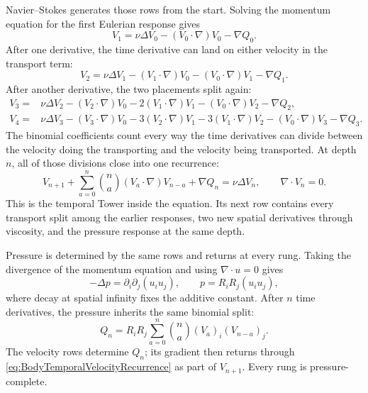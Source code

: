 Navier--Stokes generates those rows from the start.  Solving the momentum equation for the first Eulerian response gives
\[
  V_1
  =\nu\Delta V_0-(V_0\cdot\nabla)V_0-\nabla Q_0.
\]
After one derivative, the time derivative can land on either velocity in the transport term:
\[
  V_2
  =\nu\Delta V_1
  -(V_1\cdot\nabla)V_0
  -(V_0\cdot\nabla)V_1
  -\nabla Q_1.
\]
After another derivative, the two placements split again:
\[
\begin{aligned}
  V_3={}&
  \nu\Delta V_2
  -(V_2\cdot\nabla)V_0
  -2(V_1\cdot\nabla)V_1
  -(V_0\cdot\nabla)V_2
  -\nabla Q_2,
  \\
  V_4={}&
  \nu\Delta V_3
  -(V_3\cdot\nabla)V_0
  -3(V_2\cdot\nabla)V_1
  -3(V_1\cdot\nabla)V_2
  -(V_0\cdot\nabla)V_3
  -\nabla Q_3.
\end{aligned}
\]
The binomial coefficients count every way the time derivatives can divide between the velocity doing the transporting and the velocity being transported.  At depth \(n\), all of those divisions close into one recurrence:
\begin{equation}\label{eq:BodyTemporalVelocityRecurrence}
  V_{n+1}
  +\sum_{a=0}^{n}\binom{n}{a}(V_a\cdot\nabla)V_{n-a}
  +\nabla Q_n
  =\nu\Delta V_n,
  \qquad
  \nabla\cdot V_n=0.
\end{equation}
This is the temporal Tower inside the equation.  Its next row contains every transport split among the earlier responses, two new spatial derivatives through viscosity, and the pressure response at the same depth.

Pressure is determined by the same rows and returns at every rung.  Taking the divergence of the momentum equation and using \(\nabla\cdot u=0\) gives
\begin{equation}\label{eq:PressureNormalization}
  -\Delta p=\partial_i\partial_j(u_i u_j),
  \qquad
  p=R_iR_j(u_i u_j),
\end{equation}
where decay at spatial infinity fixes the additive constant.  After \(n\) time derivatives, the pressure inherits the same binomial split:
\begin{equation}\label{eq:BodyTemporalPressureRecurrence}
  Q_n
  =R_iR_j
  \sum_{a=0}^{n}\binom{n}{a}
  (V_a)_i(V_{n-a})_j.
\end{equation}
The velocity rows determine \(Q_n\); its gradient then returns through \eqref{eq:BodyTemporalVelocityRecurrence} as part of \(V_{n+1}\).  Every rung is pressure-complete.

